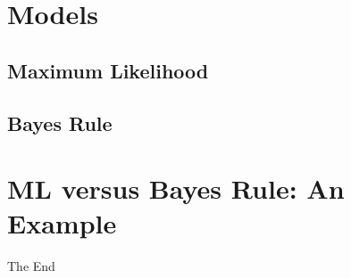 \documentclass[14pt,handout]{beamer}
\begin{document}
\section{Models}

\subsection{Maximum Likelihood}

\subsection{Bayes Rule}

\section{ML versus Bayes Rule: An Example}


\begin{frame}
\Huge{\centerline{The End}}
\end{frame}

\end{document}
